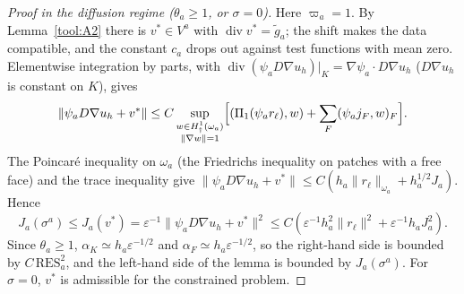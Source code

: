 \documentclass[11pt]{article}
\newcommand{\eps}{\varepsilon}
\newcommand{\dv}{\operatorname{div}}
\theoremstyle{plain}
\theoremstyle{remark}
\numberwithin{equation}{section}
\begin{document}
\begin{proof}[Proof in the diffusion regime ($\theta_a\ge1$, or $\sigma=0$)]
Here $\varpi_a=1$. By Lemma~\ref{tool:A2} there is $v^*\in V^a$ with $\dv v^*=\tilde g_a$; the shift
makes the data compatible, and the constant $c_a$ drops out against test functions with mean zero.
Elementwise integration by parts, with $\dv(\psi_aD\nabla u_h)|_K=\nabla\psi_a\cdot D\nabla u_h$
($D\nabla u_h$ is constant on $K$), gives
\[
  \|\psi_aD\nabla u_h+v^*\|\le C\sup_{\substack{w\in H^1_\dagger(\omega_a)\\ \|\nabla w\|=1}}
  \Bigl[(\Pi_1(\psi_ar_\ell),w)+\sum_F(\psi_aj_F,w)_F\Bigr].
\]
The Poincar\'e inequality on $\omega_a$ (the Friedrichs inequality on patches with a free face) and
the trace inequality give $\|\psi_aD\nabla u_h+v^*\|\le C(h_a\|r_\ell\|_{\omega_a}+h_a^{1/2}J_a)$.
Hence
\[
  J_a(\sigma^a)\le J_a(v^*)=\eps^{-1}\|\psi_aD\nabla u_h+v^*\|^2
  \le C(\eps^{-1}h_a^2\|r_\ell\|^2+\eps^{-1}h_aJ_a^2).
\]
Since $\theta_a\ge1$, $\alpha_K\simeq h_a\eps^{-1/2}$ and $\alpha_F\simeq h_a\eps^{-1/2}$, so the
right-hand side is bounded by $C\,\mathrm{RES}_a^2$, and the left-hand side of the lemma is bounded
by $J_a(\sigma^a)$. For $\sigma=0$, $v^*$ is admissible for the constrained problem.
\end{proof}
\end{document}
